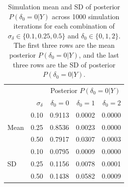 \documentclass[AMA,STIX1COL]{WileyNJD-v2}
\begin{document}
\clearpage 

\begin{table}[!ht]
\centering
\begin{tabular}{lrrrr}
	&	& \multicolumn{3}{c}{Posterior $P(\delta_0 = 0 \vert Y)$} 
\\ \cline{3-5}
 & $\sigma_\delta$ & $\delta_0 = 0$ & $\delta_0 = 1$ & $\delta_0 = 2$ \\ 
  \toprule
\multirow{3}{*}{Mean} & 0.10 & 0.9113 & 0.0002 & 0.0000 \\ 
  				 & 0.25 & 0.8536 & 0.0023 & 0.0000 \\ 
   				& 0.50 & 0.7917 & 0.0307 & 0.0003 \\ \hline
   \multirow{3}{*}{SD} & 0.10 & 0.0795 & 0.0009 & 0.0000 \\ 
  				 & 0.25 & 0.1156 & 0.0078 & 0.0001 \\ 
  				 & 0.50 & 0.1438 & 0.0582 & 0.0009 \\ 
   \bottomrule
\end{tabular}
\caption{Simulation mean and SD of posterior $P(\delta_0 = 0 \vert Y)$ across 1000 simulation iterations for each combination of $\sigma_{\delta} \in \{0.1, 0.25, 0.5\}$ and $\delta_0 \in \{0, 1, 2\}$.
The first three rows are the mean posterior $P(\delta_0 = 0 \vert Y)$, and the last three rows are the SD of posterior $P(\delta_0 = 0 \vert Y)$.} 
\label{table:spike-height}
\end{table}


\clearpage
\end{document}
